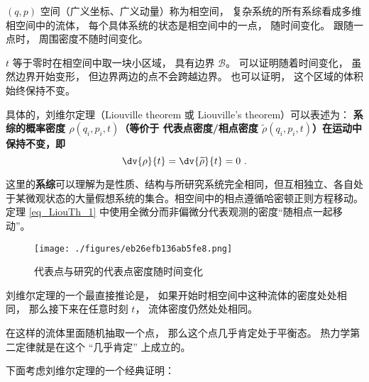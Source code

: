 

$(q, p)$ 空间（广义坐标、广义动量）称为相空间， 复杂系统的所有系综看成多维相空间中的流体， 每个具体系统的状态是相空间中的一点， 随时间变化。 跟随一点时， 周围密度不随时间变化。

$t$ 等于零时在相空间中取一块小区域， 具有边界 $\mathcal B$。 可以证明随着时间变化， 虽然边界开始变形， 但边界两边的点不会跨越边界。 也可以证明， 这个区域的体积始终保持不变。

具体的，刘维尔定理（Liouville theorem 或 Liouville's theorem）可以表述为：
\textbf{系综的概率密度 $\rho(q_i, p_i, t)$（等价于 代表点密度/相点密度 $\widetilde \rho(q_i, p_i, t)$）在运动中保持不变，即}
\begin{equation}\label{eq_LiouTh_1}
\dv{\rho}{t} = \dv{\widetilde{\rho}}{t} = 0 ~.
\end{equation}

这里的\textbf{系综}可以理解为是性质、结构与所研究系统完全相同，但互相独立、各自处于某微观状态的大量假想系统的集合。相空间中的相点遵循哈密顿正则方程移动。定理 \autoref{eq_LiouTh_1} 中使用全微分而非偏微分代表观测的密度“随相点一起移动”。

\begin{figure}[ht]
\centering
\texttt{[image: ./figures/eb26efb136ab5fe8.png]}
\caption{代表点与研究的代表点密度随时间变化} \label{fig_LiouTh_2}
\end{figure}




刘维尔定理的一个最直接推论是， 如果开始时相空间中这种流体的密度处处相同， 那么接下来在任意时刻 $t$， 流体密度仍然处处相同。

在这样的流体里面随机抽取一个点， 那么这个点几乎肯定处于平衡态。 热力学第二定律就是在这个 “几乎肯定” 上成立的。


















下面考虑刘维尔定理的一个经典证明：

